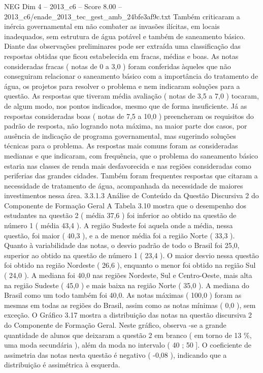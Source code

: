 \begin{textsample}{NEG Dim 4 – 2013\_c6 – Score 8.00 – 2013\_c6/enade\_2013\_tec\_gest\_amb\_24bfe3af9c.txt}
Também criticaram a inércia governamental em não combater as invasões ilícitas, em locais inadequados, sem estrutura de água potável e também de saneamento básico.
Diante das observações preliminares pode ser extraída uma classificação das respostas obtidas que ficou estabelecida em fracas, médias e boas.
As notas consideradas fracas ( notas de 0 a 3,0 ) foram conferidas àqueles que não conseguiram relacionar o saneamento básico com a importância do tratamento de água, os projetos para resolver o problema e nem indicaram soluções para a questão.
As respostas que tiveram média avaliação ( notas de 3,5 a 7,0 ) tocaram, de algum modo, nos pontos indicados, mesmo que de forma insuficiente.
Já as respostas consideradas boas ( notas de 7,5 a 10,0 ) preencheram os requisitos do padrão de resposta, não logrando nota máxima, na maior parte dos casos, por ausência de indicação de programa governamental, mas sugerindo soluções técnicas para o problema.
As respostas mais comuns foram as consideradas medianas e que indicaram, com frequência, que o problema do saneamento básico estaria nas classes de renda mais desfavorecida e nas regiões consideradas como periferias das grandes cidades.
Também foram frequentes respostas que citaram a necessidade de tratamento de água, acompanhada da necessidade de maiores investimentos nessa área. 3.3.1.3 Análise de Conteúdo da Questão Discursiva 2 do Componente de Formação Geral A Tabela 3.10 mostra que o desempenho dos estudantes na questão 2 ( média 37,6 ) foi inferior ao obtido na questão de número 1 ( média 43,4 ).
A região Sudeste foi aquela onde a média, nessa questão, foi maior ( 40,3 ), e a de menor média foi a região Norte ( 33,3 ).
Quanto à variabilidade das notas, o desvio padrão de todo o Brasil foi 25,0, superior ao obtido na questão de número 1 ( 23,4 ).
O maior desvio nessa questão foi obtido na região Nordeste ( 26,6 ), enquanto o menor foi obtido na região Sul ( 24,0 ).
A mediana foi 40,0 nas regiões Nordeste, Sul e Centro-Oeste, mais alta na região Sudeste ( 45,0 ) e mais baixa na região Norte ( 35,0 ).
A mediana do Brasil como um todo também foi 40,0.
As notas máximas ( 100,0 ) foram as mesmas em todas as regiões do Brasil, assim como as notas mínimas ( 0,0 ), sem exceção.
O Gráfico 3.17 mostra a distribuição das notas na questão discursiva 2 do Componente de Formação Geral.
Neste gráfico, observa -se a grande quantidade de alunos que deixaram a questão 2 em branco ( em torno de 13 \%, uma moda secundária ), além da moda no intervalo ( 40 ; 50 ].
O coeficiente de assimetria das notas nesta questão é negativo ( -0,08 ), indicando que a distribuição é assimétrica à esquerda.

\end{textsample}
